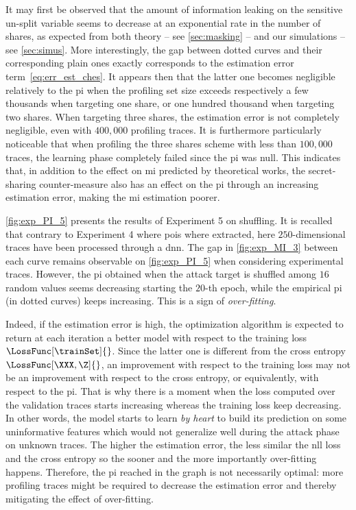 It may first be observed that the amount of information leaking on the sensitive un-split variable seems to decrease at an exponential rate in the number of shares, as expected from both theory -- see \autoref{sec:masking} -- and our simulations -- see \autoref{sec:simus}.
More interestingly, the gap between dotted curves and their corresponding plain ones exactly corresponds to the estimation error term~\eqref{eq:err_est_ches}.
It appears then that the latter one becomes negligible relatively to the \gls{pi} when the profiling set size exceeds respectively a few thousands when targeting one share, or one hundred thousand when targeting two shares.
When targeting three shares, the estimation error is not completely negligible, even with \(400,000\) profiling traces.
It is furthermore particularly noticeable that when profiling the three shares scheme with less than \(100,000\) traces, the learning phase completely failed since the \gls{pi} was null. 
This indicates that, in addition to the effect on \gls{mi} predicted by theoretical works, the secret-sharing counter-measure also has an effect on the \gls{pi} through an increasing estimation error, making the \gls{mi} estimation poorer.
  
  
\autoref{fig:exp_PI_5} presents the results of Experiment 5 on shuffling. 
It is recalled that contrary to Experiment 4 where \glspl{poi} where extracted, here \(250\)-dimensional traces have been processed through a \gls{dnn}. 
The gap in \autoref{fig:exp_MI_3} between each curve remains observable on \autoref{fig:exp_PI_5} when considering experimental traces.
However, the \gls{pi} obtained when the attack target is shuffled among \(16\) random values seems decreasing starting the \(20\)-th epoch, while the empirical \gls{pi} (in dotted curves) keeps increasing.
This is a sign of \emph{over-fitting}.

Indeed, if the estimation error is high, the optimization algorithm is expected to return at each iteration a better model with respect to the training loss \(\LossFunc[\trainSet]{}\).
Since the latter one is different from the cross entropy \(\LossFunc[\XXX, \Z]{}\), an improvement with respect to the training loss may not be an improvement with respect to the cross entropy, or equivalently, with respect to the \gls{pi}.
That is why there is a moment when the loss computed over the validation traces starts increasing whereas the training loss keep decreasing.
In other words, the model starts to learn \emph{by heart} to build its prediction on some uninformative features which would not generalize well during the attack phase on unknown traces.
The higher the estimation error, the less similar the \gls{nll} loss and the cross entropy so the sooner and the more importantly over-fitting happens.
Therefore, the \gls{pi} reached in the graph is not necessarily optimal: more profiling traces might be required to decrease the estimation error and thereby mitigating the effect of over-fitting.

